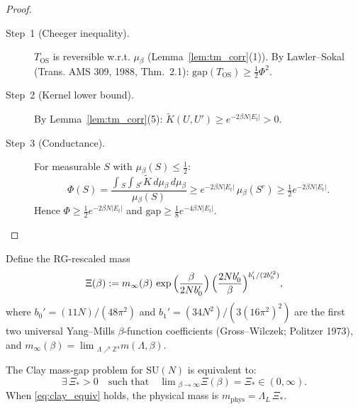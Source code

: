 \begin{proof}
\begin{description}
\item[Step~1 (Cheeger inequality).]
$T_{\mathrm{OS}}$ is reversible w.r.t. $\mu{}_\beta{}$ (Lemma~\ref{lem:tm_corr}(1)).
By Lawler--Sokal (Trans. AMS 309, 1988, Thm.~2.1): $\mathrm{gap}(T_{\mathrm{OS}}) \ge \tfrac{1}{2}\Phi^2$.

\item[Step~2 (Kernel lower bound).]
By Lemma~\ref{lem:tm_corr}(5): $\tilde{K}(U,U')\ge{} e^{-2\beta{} N|E_t|}>0$.

\item[Step~3 (Conductance).]
For measurable $S$ with $\mu{}_\beta{}(S)\le{}\tfrac{1}{2}$:
\begin{equation*}
  \Phi{}(S) = \frac{\int{}_S\int{}_{S^c}\tilde{K}\,{}d\mu{}_\beta{}\,{}d\mu{}_\beta{}}{\mu{}_\beta{}(S)}
  \ge{} e^{-2\beta{} N|E_t|}\,{}\mu{}_\beta{}(S^c)
  \ge{} \tfrac{1}{2}e^{-2\beta{} N|E_t|}.
\end{equation*}
Hence $\Phi{}\ge{}\tfrac{1}{2}e^{-2\beta{} N|E_t|}$ and $\mathrm{gap}\ge{}\tfrac{1}{8}e^{-4\beta{} N|E_t|}$.

\end{description}
\end{proof}

\begin{theorem}
\label{thm:clay_equiv}
Define the RG-rescaled mass
\begin{equation}
\label{eq:xi_def}
  \Xi{}(\beta{}) := m_{\infty{}}(\beta{})\,{}\exp{}\Bigl(\frac{\beta{}}{2Nb_0'}\Bigr)\,{}\Bigl(\frac{2Nb_0'}{\beta{}}\Bigr)^{b_1'/(2b_0'^2)},
\end{equation}
where $b_0'=(11N)/(48\pi{}^2)$ and $b_1'=(34N^2)/(3(16\pi{}^2)^2)$ are the first two
universal Yang--Mills $\beta{}$-function coefficients (Gross--Wilczek; Politzer 1973),
and $m_{\infty{}}(\beta{})=\lim{}_{\Lambda{}\nearrow{}\mathbb{Z}^4}m(\Lambda{},\beta{})$.

The Clay mass-gap problem for $\mathrm{SU}(N)$ is equivalent to:
\begin{equation}
\label{eq:clay_equiv}
  \exists{}\,{}\Xi{}_*>0 \quad{}\text{such that}\quad{}\lim{}_{\beta{}\to{}\infty{}}\Xi{}(\beta{})=\Xi{}_*\in{}(0,\infty{}).
\end{equation}
When \eqref{eq:clay_equiv} holds, the physical mass is $m_{\mathrm{phys}}=\Lambda{}_L\,{}\Xi{}_*$.
\end{theorem}

